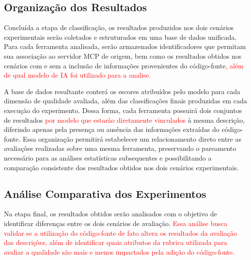 \subsection{Organização dos Resultados}

Concluída a etapa de classificação, os resultados produzidos nos dois cenários experimentais serão coletados e estruturados em uma base de dados unificada. Para cada ferramenta analisada, serão armazenados identificadores que permitam sua associação ao servidor MCP de origem, bem como os resultados obtidos nos cenários com e sem a inclusão de informações provenientes do código-fonte\textcolor{red}{, além de qual modelo de IA foi utilizado para a analise.}

A base de dados resultante conterá os escores atribuídos pelo modelo para cada dimensão de qualidade avaliada, além das classificações finais produzidas em cada execução do experimento. Dessa forma, cada ferramenta possuirá dois conjuntos de resultados \textcolor{red}{por modelo que estarão diretamente vinculados} à mesma descrição, diferindo apenas pela presença ou ausência das informações extraídas do código-fonte. Essa organização permitirá estabelecer um relacionamento direto entre as avaliações realizadas sobre uma mesma ferramenta, preservando o pareamento necessário para as análises estatísticas subsequentes e possibilitando a comparação consistente dos resultados obtidos nos dois cenários experimentais.

\subsection{Análise Comparativa dos Experimentos}

Na etapa final, os resultados obtidos serão analisados com o objetivo de identificar diferenças entre os dois cenários de avaliação. \textcolor{red}{Essa análise busca validar se a utilização do código-fonte de fato altera os resultados da avaliação das descrições, além de identificar quais atributos da rubrica utilizada para avaliar a qualidade são mais e menos impactados pela adição do código-fonte.}

